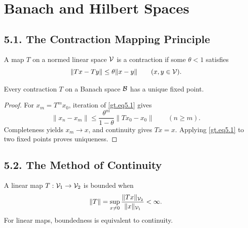 \chapter{Banach and Hilbert Spaces}

\section*{5.1. The Contraction Mapping Principle}

\begin{definition}\label{gt.def5.1.contraction-mapping}

A map $T$ on a normed linear space $\mathcal{V}$ is a contraction if some $\theta<1$
satisfies
\begin{equation}\label{gt.eq5.1}
\|Tx-Ty\|\leq\theta\|x-y\| \qquad (x,y\in\mathcal{V}).
\end{equation}
\end{definition}

\begin{theorem}\label{gt.thm5.1}

Every contraction $T$ on a Banach space $\mathcal{B}$ has a unique fixed point.
\end{theorem}
\begin{proof}

\sketch For $x_m=T^m x_0$, iteration of \eqref{gt.eq5.1} gives
\[
\|x_n-x_m\|\leq \frac{\theta^m}{1-\theta}\|Tx_0-x_0\|
\qquad(n\geq m).
\]
Completeness yields $x_m\to x$, and continuity gives $Tx=x$. Applying
\eqref{gt.eq5.1} to two fixed points proves uniqueness.
\end{proof}

\section*{5.2. The Method of Continuity}

\begin{definition}\label{gt.def5.2.bounded-linear-operator}

A linear map $T:\mathcal{V}_1\to\mathcal{V}_2$ is bounded when
\begin{equation}\label{gt.eq5.2}
\|T\|=\sup_{x\neq0}\frac{\|Tx\|_{\mathcal{V}_2}}{\|x\|_{\mathcal{V}_1}}<\infty.
\end{equation}
For linear maps, boundedness is equivalent to continuity.
\end{definition}

